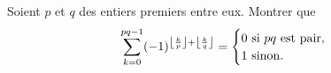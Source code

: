 Soient $p$ et $q$ des entiers premiers entre eux. Montrer que
$$\sum_{k=0}^{pq-1} (-1)^{\left\lfloor \frac{k}{p}\right\rfloor + \left\lfloor \frac{k}{q}\right\rfloor} = \begin{cases} 0 \textnormal{ si } pq \textnormal{ est pair,}\\ 1 \textnormal{ sinon.}\end{cases}$$